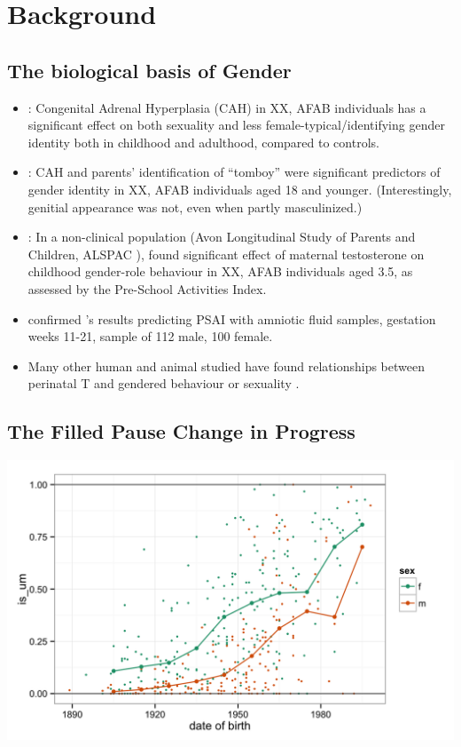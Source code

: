 \documentclass[a0,portrait]{a0poster}
\begin{document}
\begin{multicols}{2}
\begin{enumerate}
\end{enumerate}
\section*{Background}
\subsection{The biological basis of Gender}

\begin{itemize}
	\item \citet{hinesetal2004}: Congenital Adrenal Hyperplasia (CAH) in XX, AFAB individuals has a significant effect on both sexuality and less female-typical/identifying gender identity both in childhood and adulthood, compared to controls.
	\item \citet{berenbaumbailey2003}: CAH and parents' identification of ``tomboy'' were significant predictors of gender identity in XX, AFAB individuals aged 18 and younger. (Interestingly, genitial appearance was not, even when partly masculinized.)
	\item \citet{hinesetal2002}: In a non-clinical population (Avon Longitudinal Study of Parents and Children, ALSPAC \citealt{alspac2001}), found significant effect of maternal testosterone on childhood gender-role behaviour in XX, AFAB individuals aged 3.5, as assessed by the Pre-School Activities Index.
	\item \citet{auyeungetal2009} confirmed \citet{hinesetal2002}'s results predicting PSAI with amniotic fluid samples, gestation weeks 11-21, sample of 112 male, 100 female.
	\item Many other human and animal studied have found relationships between perinatal T and gendered behaviour or sexuality \citep[see][for reviews]{hines2006, balthazart2011}.
\end{itemize}

\subsection{The Filled Pause Change in Progress}

\begin{center}\vspace{1cm}
\includegraphics[width=0.6\linewidth]{um.png}
\end{center}\vspace{1cm}


\end{multicols}
\end{document}
